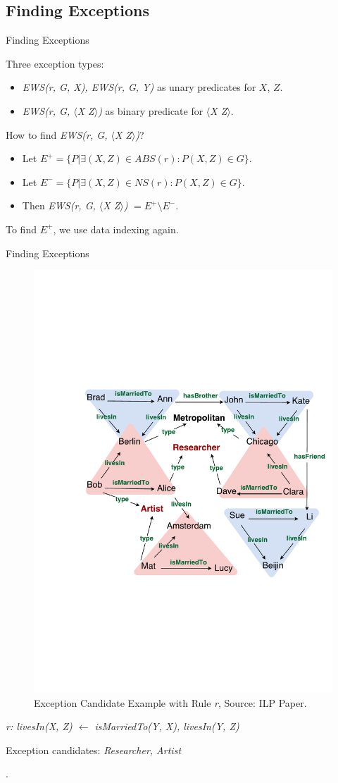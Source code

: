 \documentclass{beamer}
\begin{document}
\subsection{Finding Exceptions}

\begin{frame}{Finding Exceptions}

Three exception types:
\begin{itemize}
	\item \textit{EWS(r, G, X), EWS(r, G, Y)} as unary predicates for $X$, $Z$.
	\item {
		\textit{EWS(r, G, $\langle$X Z$\rangle$)} as binary predicate for \textit{$\langle$X Z$\rangle$}.
		\pause
	}
\end{itemize}

How to find \textit{EWS(r, G, $\langle$X Z$\rangle$)}?
\begin{itemize}
	\item Let $E^+ = \{P | \exists (X, Z) \in ABS(r): P(X, Z) \in G\}$.
	\item Let $E^- = \{P | \exists (X, Z) \in NS(r): P(X, Z) \in G\}$.
	\item Then \textit{EWS(r, G, $\langle$X Z$\rangle$)} $= E^+ \setminus E^-$.
\end{itemize}

To find $E^+$, we use data indexing again.

\end{frame}

\begin{frame}{Finding Exceptions}

\begin{figure}[h]
	\centering
	\includegraphics[page=1,width=.5\textwidth]{example.pdf}
	\caption{Exception Candidate Example with Rule \textit{r}, Source: ILP Paper.}
\end{figure}

\centerline{\textit{r: livesIn(X, Z) $\leftarrow$ isMarriedTo(Y, X), livesIn(Y, Z)}}
\centerline{Exception candidates: \textit{Researcher, Artist}}.

\end{frame}
\end{document}
